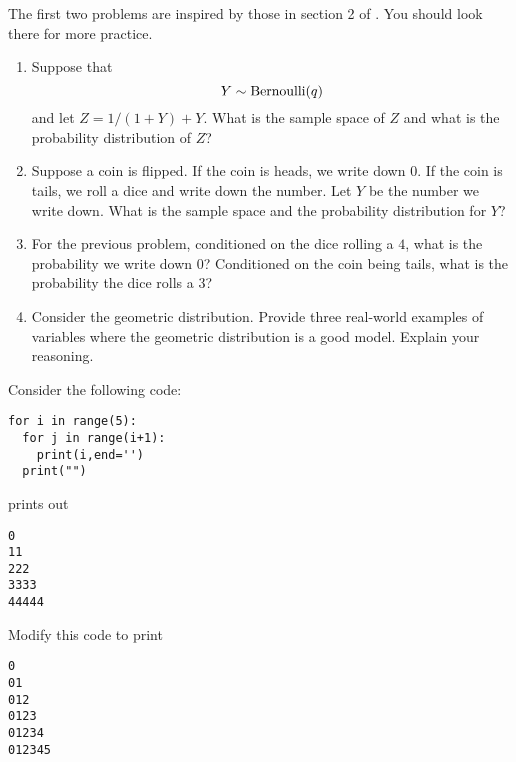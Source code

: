  



\begin{exercise}
The first two problems are inspired by those in section 2 of \cite{evans}.   You should look there for more practice. 
\begin{enumerate}[label=(\alph*)]
\item Suppose that 
\begin{equation*}
Y \sim {\rm Bernoulli}(q)
\end{equation*}
and let $Z = 1/(1+Y) + Y$. What is the sample space of $Z$ and what is the probability distribution of $Z$? %
\item Suppose a coin is flipped. If the coin is heads, we write down $0$. If the coin is tails, we roll a dice and write down the number. Let $Y$ be the number we write down.  What is the sample space and the probability distribution for $Y$? 
\item For the previous problem, conditioned on the dice rolling a $4$, what is the probability we write down $0$? Conditioned on the coin being tails, what is the probability the dice rolls a $3$?
\item Consider the geometric distribution. Provide three real-world examples of variables where the geometric distribution is a good model. Explain your reasoning. 
\end{enumerate}
\end{exercise}




 \begin{exercise}
 
 

Consider the following code:

\begin{Verbatim}
for i in range(5):
  for j in range(i+1):
    print(i,end='')
  print("")
\end{Verbatim}
prints out
\begin{Verbatim}
0
11
222
3333
44444
\end{Verbatim}
Modify this code to print
\begin{Verbatim}
0
01
012
0123
01234
012345
\end{Verbatim}
\end{exercise}


